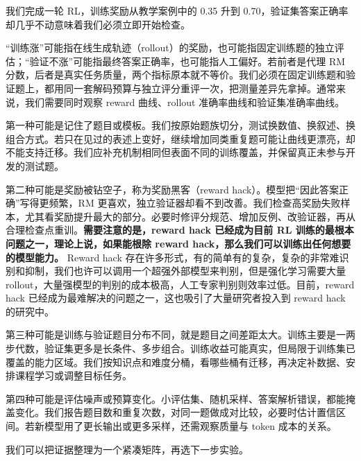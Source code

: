 我们完成一轮 RL，训练奖励从教学案例中的 0.35 升到 0.70，验证集答案正确率却几乎不动意味着我们必须立即开始检查。

``训练涨''可能指在线生成轨迹（rollout）的奖励，也可能指固定训练题的独立评估；``验证不涨''可能指最终答案正确率，也可能指人工偏好。若前者是代理 RM 分数，后者是真实任务质量，两个指标原本就不等价。我们必须在固定训练题和验证题上，都用同一套解码预算与独立评分重评一次，把测量差异先拿掉。通常来说，我们需要同时观察 reward 曲线、rollout 准确率曲线和验证集准确率曲线。

第一种可能是记住了题目或模板。我们按原始题族切分，测试换数值、换叙述、换组合方式。若只在见过的表述上变好，继续增加同类重复题可能让曲线更漂亮，却不能支持迁移。我们应补充机制相同但表面不同的训练覆盖，并保留真正未参与开发的测试题。

第二种可能是奖励被钻空子，称为奖励黑客（reward hack）。模型把``因此答案正确''写得更频繁，RM 更喜欢，独立验证器却看不到改善。我们检查高奖励失败样本，尤其看奖励提升最大的部分。必要时修评分规范、增加反例、改验证器，再从合理检查点重训。\textbf{需要注意的是，reward hack 已经成为目前 RL 训练的最根本问题之一，理论上说，如果能根除 reward hack，那么我们可以训练出任何想要的模型能力。} Reward hack 存在许多形式，有的简单有的复杂，复杂的非常难识别和抑制，我们也许可以调用一个超强外部模型来判别，但是强化学习需要大量 rollout，大量强模型的判别的成本极高，人工专家判别则效率过低。目前，reward hack 已经成为最难解决的问题之一，这也吸引了大量研究者投入到 reward hack 的研究中。

第三种可能是训练与验证题目分布不同，就是题目之间差距太大。训练主要是一两步代数，验证集更多是长条件、多步组合。训练收益可能真实，但局限于训练集已覆盖的能力区域。我们按知识点和难度分桶，看哪些桶有迁移，再决定补数据、安排课程学习或调整目标任务。

第四种可能是评估噪声或预算变化。小评估集、随机采样、答案解析错误，都能掩盖变化。我们报告题目数和重复次数，对同一题做成对比较，必要时估计置信区间。若新模型用了更长输出或更多采样，还需观察质量与 token 成本的关系。

我们可以把证据整理为一个紧凑矩阵，再选下一步实验。

